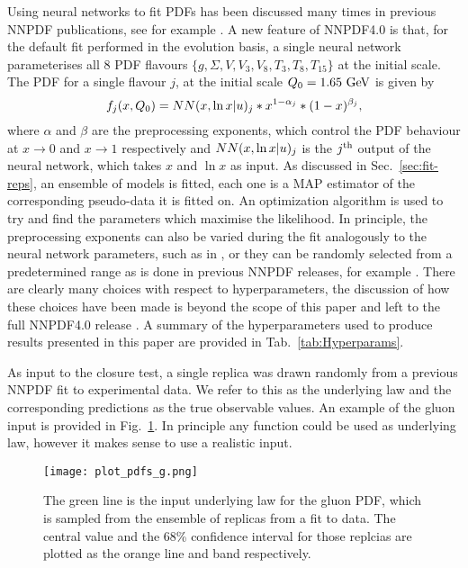 Using neural networks to fit PDFs has been discussed many times in previous
NNPDF publications, see for example \cite{nnpdf30, Ball_2017}. A new feature of
NNPDF4.0 is that, for the default fit performed in the evolution basis, a single
neural network parameterises all 8 PDF flavours $\{ g, \Sigma, V, V_3, V_8, T_3,
T_8, T_{15} \}$ at the initial scale. The PDF for a single flavour $j$, at the
initial scale $Q_0 = 1.65~{\rm GeV}$ is given by
\begin{equation}
    f_j(x, Q_0) = NN(x, \ln x | u)_j * x^{1-\alpha_j} * (1-x)^{\beta_j},
\end{equation}
where $\alpha$ and $\beta$ are the preprocessing exponents, which control the
PDF behaviour at $x \to 0$ and $x \to 1$ respectively and $NN(x, \ln x |
u)_j$ is the $j^{\rm th}$ output of the neural network, which takes $x$
and $\ln x$ as input. As discussed in Sec.~\ref{sec:fit-reps}, an ensemble of
models is fitted, each one is a MAP estimator of the corresponding pseudo-data
it is fitted on. An optimization algorithm is used to try and find the
parameters which maximise the likelihood. In principle, the preprocessing
exponents can also be varied during the fit analogously to the neural network
parameters, such as in \cite{Carrazza_2019}, or they can be randomly selected
from a predetermined range as is done in previous NNPDF releases, for example
\cite{Ball_2017}. There are clearly many choices with respect to
hyperparameters, the discussion of how these choices have been made is beyond
the scope of this paper and left to the full NNPDF4.0 release \cite{NNPDF40}. A
summary of the hyperparameters used to produce results presented in this paper
are provided in Tab.~\ref{tab:Hyperparams}.

As input to the closure test, a single replica was drawn randomly from a
previous NNPDF fit to experimental data. We refer to this as the underlying law
and the corresponding predictions as the true observable values. An example of
the gluon input is provided in Fig.~\ref{fig:InputGluonPDF}. In principle any
function could be used as underlying law, however it makes sense to use a
realistic input.

\begin{figure}
    \centering
    \texttt{[image: plot\_pdfs\_g.png]}
    \caption{The green line is the input underlying law for the gluon PDF, which
    is sampled from the ensemble of replicas from a fit to data. The central
    value and the 68\% confidence interval for those replcias are plotted as the
    orange line and band respectively.}
    \label{fig:InputGluonPDF}
\end{figure}

